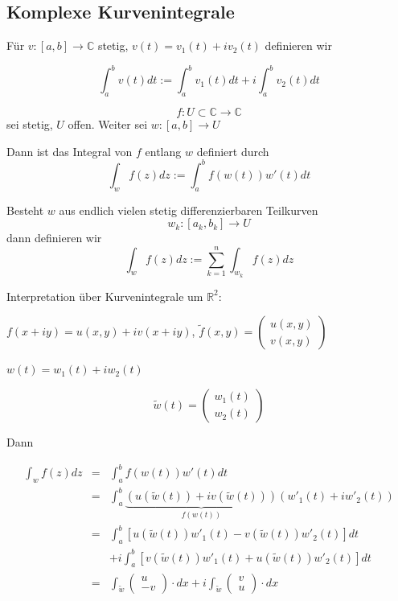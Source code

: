 \documentclass[10pt,a4paper]{article}
\begin{document}
\subsection{Komplexe Kurvenintegrale}

Für $v: [a,b] \rightarrow \mathbb{C}$ stetig, $v(t)=v_1(t) + iv_2(t)$ definieren wir


$$\int_{a}^{b}v(t) dt := \int_{a}^{b} v_1 (t) dt + i \int_{a}^{b} v_2(t) dt$$

\begin{defi}
$$f: U \subset \mathbb{C} \rightarrow \mathbb{C}$$ sei stetig, $U$ offen. Weiter sei $w:[a,b] \rightarrow U$

Dann ist das Integral von $f$ entlang $w$ definiert durch $$ \int_{w} f(z) dz := \int_{a}^{b} f(w(t))w'(t) dt$$

Besteht $w$ aus endlich vielen stetig differenzierbaren Teilkurven $$w_k:[a_k,b_k] \rightarrow U$$ dann definieren wir $$\int_{w} f(z) dz := \sum_{k=1}^{n} \int_{w_k} f(z) dz$$

\end{defi}

Interpretation über Kurvenintegrale um $\mathbb{R}^{2}$:

$f(x+iy)=u(x,y) + iv(x+iy)$, $\tilde{f}(x,y)= \begin{pmatrix}
u(x,y) \\ v(x,y)
\end{pmatrix} $

$w(t)=w_1(t)+iw_2(t)$

$$\tilde{w}(t)= \begin{pmatrix}
w_1(t) \\w_2(t)
\end{pmatrix} $$

Dann

\begin{eqnarray}
\int_{w} f(z) dz &=& \int_{a}^{b} f(w(t))w'(t) dt \\
&=& \int_{a}^{b} \underbrace{(u(\tilde{w}(t)) +iv(\tilde{w}(t)))}_{f(w(t))}(w'_1(t) + iw'_2(t)) \\
&=& \int_{a}^{b} [u(\tilde{w}(t))w'_1(t)-v(\tilde{w}(t))w'_2(t)] dt \\
& & + i \int_{a}^{b} [v(\tilde{w}(t))w'_1(t)+u(\tilde{w}(t))w'_2(t)] dt \\
&=& \int_{\tilde{w}} \begin{pmatrix}
u \\ -v
\end{pmatrix} \cdot dx + i \int_{\tilde{w}} \begin{pmatrix}
v \\ u
\end{pmatrix} \cdot dx
\end{eqnarray}
\end{document}
